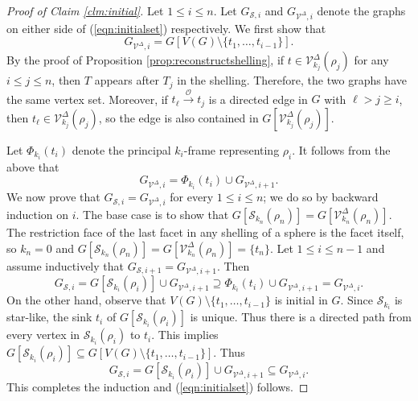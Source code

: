 \documentclass[11pt,twoside]{article}
\theoremstyle{definition}
\newcommand{\cS}{\mathcal{S}}
\newcommand{\cO}{\mathcal{O}}
\newcommand{\cV}{\mathcal{V}}
\begin{document}
\begin{proof}[Proof of Claim \ref{clm:initial}]
Let $1 \le i \le n$. Let $G_{\cS, i}$ and $G_{\cV^\Delta, i}$ denote the graphs on either side of (\ref{eqn:initialset}) respectively. We first show that 
\[
G_{\cV^\Delta, i} = G[V(G) \setminus \{t_1, \dots, t_{i-1}\}].
\]
By the proof of Proposition \ref{prop:reconstructshelling}, if $t \in \cV^\Delta_{k_j}(\rho_j)$ for any $i \le j \le n$, then $T$ appears after $T_j$ in the shelling. Therefore, the two graphs have the same vertex set. Moreover, if $t_\ell \xrightarrow{\cO} t_j$ is a directed edge in $G$ with $\ell > j \ge i$, then $t_\ell \in \cV^\Delta_{k_j}(\rho_j)$, so the edge is also contained in $G[\cV^\Delta_{k_j}(\rho_j)]$. 

Let $\Phi_{k_i}(t_i)$ denote the principal $k_i$-frame representing $\rho_i$. It follows from the above that 
\[
G_{\cV^\Delta, i} = \Phi_{k_i}(t_i) \cup G_{\cV^\Delta, i+1}. 
\]
We now prove that $G_{\cS, i} = G_{\cV^\Delta, i}$ for every $1 \le i \le n$; we do so by backward induction on $i$. The base case is to show that $G[\cS_{k_n}(\rho_n)] = G[\cV^\Delta_{k_n}(\rho_n)]$. The restriction face of the last facet in any shelling of a sphere is the facet itself, so $k_n = 0$ and $G[\cS_{k_n}(\rho_n)] = G[\cV^\Delta_{k_n}(\rho_n)] = \{t_n\}$. Let $1 \le i \le n-1$ and assume inductively that $G_{\cS, i+1} = G_{\cV^\Delta, i+1}$. Then 
\[
G_{\cS, i} = G[\cS_{k_i}(\rho_i)] \cup G_{\cV^\Delta, i+1} \supseteq \Phi_{k_i}(t_i) \cup G_{\cV^\Delta, i+1} = G_{\cV^\Delta, i}. 
\]
On the other hand, observe that $V(G) \setminus \{t_1, \dots, t_{i-1}\}$ is initial in $G$. Since $\cS_{k_i}$ is star-like, the sink $t_i$ of $G[\cS_{k_i}(\rho_i)]$ is unique. Thus there is a directed path from every vertex in $\cS_{k_i}(\rho_i)$ to $t_i$. This implies $G[\cS_{k_i}(\rho_i)] \subseteq G[V(G) \setminus \{t_1, \dots, t_{i-1}\}]$. Thus
\[
G_{\cS, i} = G[\cS_{k_i}(\rho_i)] \cup G_{\cV^\Delta, i+1} \subseteq G_{\cV^\Delta, i}. 
\]
This completes the induction and (\ref{eqn:initialset}) follows. 
\end{proof}
\end{document}
